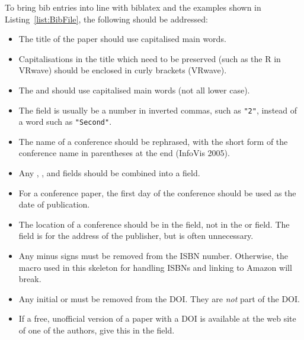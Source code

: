 To bring bib entries into line with biblatex and the examples shown in
Listing~\ref{list:BibFile}, the following should be addressed:
\begin{itemize}
      \item The title of the paper should use capitalised main words.

      \item Capitalisations in the title which need to be preserved (such as
            the R in VRwave) should be enclosed in curly brackets ({VRwave}).

      \item The  and  should use
            capitalised main words (not all lower case).

      \item The  field is usually be a number in inverted
            commas, such as \verb|"2"|, instead of a word such as
            \verb|"Second"|.

      \item The name of a conference should be rephrased, with the short
            form of the conference name in parentheses at the end (InfoVis
            2005).

      \item Any , , and 
            fields should be combined into a  field.

      \item For a conference paper, the first day of the conference
            should be used as the date of publication.

      \item The location of a conference should be in the 
            field, not in the  or  field. The
             field is for the address of the publisher, but is
            often unnecessary.


      \item Any minus signs must be removed from the ISBN number.
            Otherwise, the macro used in this skeleton for handling ISBNs and
            linking to Amazon will break.

      \item Any initial  or
             must be removed from
            the DOI. They are \emph{not} part of the DOI.

      \item If a free, unofficial version of a paper with a DOI is available
            at the web site of one of the authors, give this in the 
            field.


\end{itemize}
